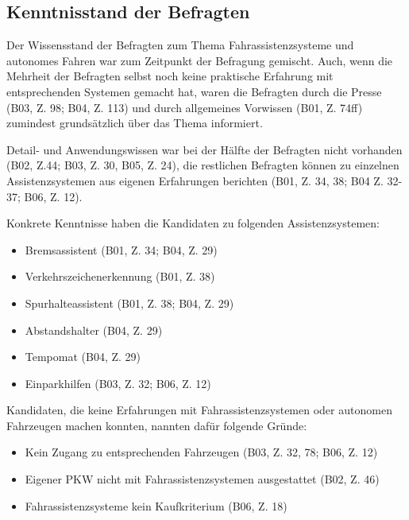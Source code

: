 \documentclass[12pt]{article}
\begin{document}
%
%

\subsection{Kenntnisstand der Befragten}
Der Wissensstand der Befragten zum Thema Fahrassistenzsysteme und autonomes Fahren war zum Zeitpunkt der Befragung gemischt. Auch, wenn die Mehrheit der Befragten selbst noch keine praktische Erfahrung mit entsprechenden Systemen gemacht hat, waren die Befragten durch die Presse (B03, Z. 98; B04, Z. 113) und durch allgemeines Vorwissen (B01, Z. 74ff) zumindest grundsätzlich über das Thema informiert.

Detail- und Anwendungswissen war bei der Hälfte der Befragten nicht vorhanden (B02, Z.44; B03, Z. 30, B05, Z. 24), die restlichen Befragten können  zu einzelnen Assistenzsystemen aus eigenen Erfahrungen berichten (B01, Z. 34, 38; B04 Z. 32-37; B06, Z. 12).

Konkrete Kenntnisse haben die Kandidaten zu folgenden Assistenzsystemen:
\begin{itemize}
  \item Bremsassistent (B01, Z. 34; B04, Z. 29)
  \item Verkehrszeichenerkennung (B01, Z. 38)
  \item Spurhalteassistent (B01, Z. 38; B04, Z. 29)
  \item Abstandshalter (B04, Z. 29)
  \item Tempomat (B04, Z. 29)
  \item Einparkhilfen (B03, Z. 32; B06, Z. 12)
\end{itemize}

Kandidaten, die keine Erfahrungen mit Fahrassistenzsystemen oder autonomen Fahrzeugen machen konnten, nannten dafür folgende Gründe:
\begin{itemize}
  \item Kein Zugang zu entsprechenden Fahrzeugen (B03, Z. 32, 78; B06, Z. 12)
  \item Eigener PKW nicht mit Fahrassistenzsystemen ausgestattet (B02, Z. 46)
  \item Fahrassistenzsysteme kein Kaufkriterium (B06, Z. 18)
\end{itemize}
\end{document}
